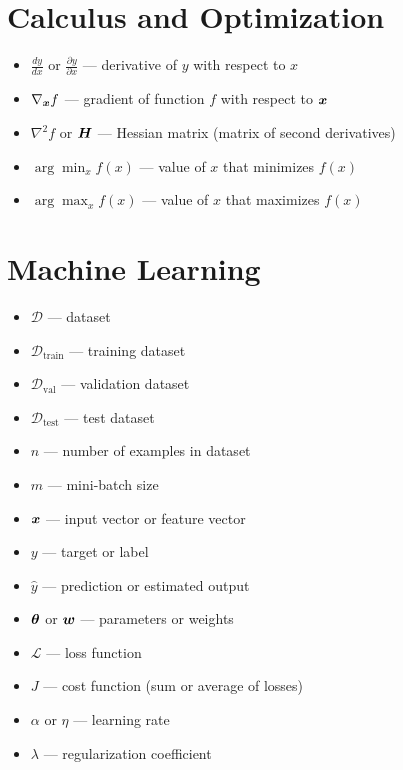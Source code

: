 \section*{Calculus and Optimization}

\begin{itemize}[leftmargin=2em]
    \item $\frac{dy}{dx}$ or $\frac{\partial y}{\partial x}$ --- derivative of $y$ with respect to $x$
    \item $\nabla_{\boldsymbol{x}} f$ --- gradient of function $f$ with respect to $\boldsymbol{x}$
    \item $\nabla^2 f$ or $\boldsymbol{H}$ --- Hessian matrix (matrix of second derivatives)
    \item $\arg\min_x f(x)$ --- value of $x$ that minimizes $f(x)$
    \item $\arg\max_x f(x)$ --- value of $x$ that maximizes $f(x)$
\end{itemize}

\section*{Machine Learning}

\begin{itemize}[leftmargin=2em]
    \item $\mathcal{D}$ --- dataset
    \item $\mathcal{D}_{\text{train}}$ --- training dataset
    \item $\mathcal{D}_{\text{val}}$ --- validation dataset
    \item $\mathcal{D}_{\text{test}}$ --- test dataset
    \item $n$ --- number of examples in dataset
    \item $m$ --- mini-batch size
    \item $\boldsymbol{x}$ --- input vector or feature vector
    \item $y$ --- target or label
    \item $\hat{y}$ --- prediction or estimated output
    \item $\boldsymbol{\theta}$ or $\boldsymbol{w}$ --- parameters or weights
    \item $\mathcal{L}$ --- loss function
    \item $J$ --- cost function (sum or average of losses)
    \item $\alpha$ or $\eta$ --- learning rate
    \item $\lambda$ --- regularization coefficient
\end{itemize}

